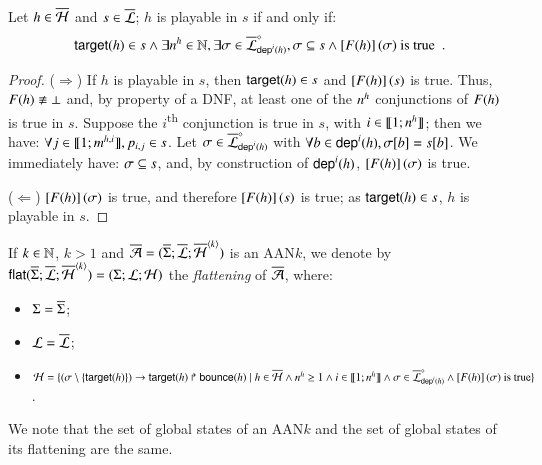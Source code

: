 \begin{lemma}
\label{lem:ppplaysubset}
  Let $h \in \overline{\mathcal{H}}$ and $s \in \overline{\mathcal{L}}$;
  $h$ is playable in $s$ if and only if:
  \[\mathsf{target}(h) \in s \wedge \exists n^{h} \in \mathbb{N}, \exists \sigma \in \overline{\mathcal{L}}^{\diamond}_{\mathsf{dep}^{i}(h)},
    \sigma \subseteq s \wedge \left[F(h)\right](\sigma) \text{ is true} \enspace.\]
\end{lemma}
%
\begin{proof}
  ($\Rightarrow$)
    If $h$ is playable in $s$, then $\mathsf{target}(h) \in s$ and $\left[F(h)\right](s)$ is true.
    Thus, $F(h) \not\equiv \bot$ and, by property of a DNF,
    at least one of the $n^{h}$ conjunctions of $F(h)$ is true in $s$.
    Suppose the $i$\textsuperscript{th} conjunction is true in $s$, with $i \in \llbracket 1; n^{h} \rrbracket$;
    then we have: $\forall j \in \llbracket 1; m^{h,i} \rrbracket, p_{i,j} \in s$.
    Let $\sigma \in \overline{\mathcal{L}}^{\diamond}_{\mathsf{dep}^{i}(h)}$
    with $\forall b \in \mathsf{dep}^{i}(h), {\sigma[b]} = {s[b]}$.
    We immediately have: $\sigma \subseteq s$,
    and, by construction of $\mathsf{dep}^{i}(h)$, $\left[F(h)\right](\sigma)$ is true.
  
  ($\Leftarrow$)
    $\left[F(h)\right](\sigma)$ is true, and therefore $\left[F(h)\right](s)$ is true;
    as $\mathsf{target}(h) \in s$, $h$ is playable in $s$.
\end{proof}

\begin{definition}
  \label{def:flattening}
  If $k \in \mathbb{N}$, $k > 1$ and $\overline{\mathcal{A}} = (\overline{\Sigma}; \overline{\mathcal{L}}; \overline{\mathcal{H}}^{{\langle k \rangle}})$ is an AAN$k$,
  we denote by
  $\mathsf{flat}(\overline{\Sigma}; \overline{\mathcal{L}}; \overline{\mathcal{H}}^{{\langle k \rangle}}) = (\Sigma; \mathcal{L}; \mathcal{H})$
  the \emph{flattening} of $\overline{\mathcal{A}}$, where:
  \begin{itemize}
    \item $\Sigma = \overline{\Sigma}$;
    
    \item $\mathcal{L} = \overline{\mathcal{L}}$;
    
    \item $\mathcal{H} = \{
      (\sigma \setminus \{ \mathsf{target}(h) \})\rightarrow\mathsf{target}(h)\Rsh\mathsf{bounce}(h) \mid
      h \in \overline{\mathcal{H}} \wedge n^{h} \geq 1 \wedge i \in \llbracket 1; n^{h} \rrbracket \wedge
      \sigma \in \overline{\mathcal{L}}^{\diamond}_{\mathsf{dep}^{i}(h)} \wedge
      \left[F(h)\right](\sigma) \text{ is true} \}$.
  \end{itemize}
\end{definition}

We note that the set of global states of an AAN$k$
and the set of global states of its flattening are the same.

